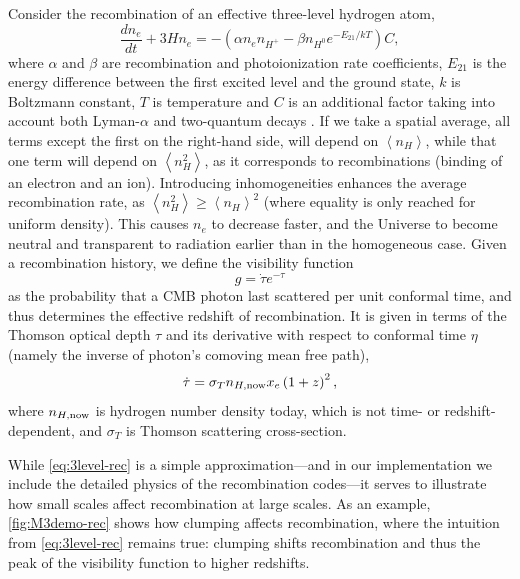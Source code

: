 Consider the recombination of an effective three-level hydrogen atom,
\begin{equation}
\frac{dn_e}{dt}+3Hn_e=-\left( \alpha n_en_{H^+}-\beta n_{H^0}e^{-E_{21}/kT} \right)C,
\label{eq:3level-rec}
\end{equation}
where $\alpha$ and $\beta$ are recombination and photoionization rate coefficients, $E_{21}$ is the energy difference between the first excited level and the ground state, $k$ is Boltzmann constant, $T$ is temperature and $C$ is an additional factor taking into account both Lyman-$\alpha$ and two-quantum decays \citep{reco-peebles,reco-zeldovich}.
If we take a spatial average, all terms except the first on the right-hand side, will depend on $\left\langle n_H \right\rangle$, while that one term will depend on $\left\langle n_H^2 \right\rangle$, as it corresponds to recombinations (binding of an electron and an ion). 
Introducing inhomogeneities enhances the average recombination rate, as $\left\langle n_H^2 \right\rangle \ge \left\langle n_H \right\rangle^2$ (where equality is only reached for uniform density). 
This causes $n_e$ to decrease faster, and the Universe to become neutral and transparent to radiation earlier than in the homogeneous case.
Given a recombination history, we define the visibility function
\begin{equation*}
g = \dot\tau e^{-\tau}
\end{equation*}
as the probability that a CMB photon last scattered per unit conformal time, and thus determines the effective redshift of recombination.
It is given in terms of the Thomson optical depth $\tau$ and its derivative with respect to conformal time $\eta$ (namely the inverse of photon's comoving mean free path),
\begin{equation}
\dot\tau = \sigma_T n_{H,\rm now} x_e \left( 1+z \right)^2, \label{eq:inv-mfp-comov}
\end{equation}
where $n_{H,\rm now}$ is hydrogen number density today, which is not time- or redshift-dependent, and $\sigma_T$ is Thomson scattering cross-section.

While \cref{eq:3level-rec} is a simple approximation---and in our implementation we include the detailed physics of the recombination codes---it serves to illustrate how small scales affect recombination at large scales. 
As an example, \cref{fig:M3demo-rec} shows how clumping affects recombination, where the intuition from \cref{eq:3level-rec} remains true: clumping shifts recombination and thus the peak of the visibility function to higher redshifts.


